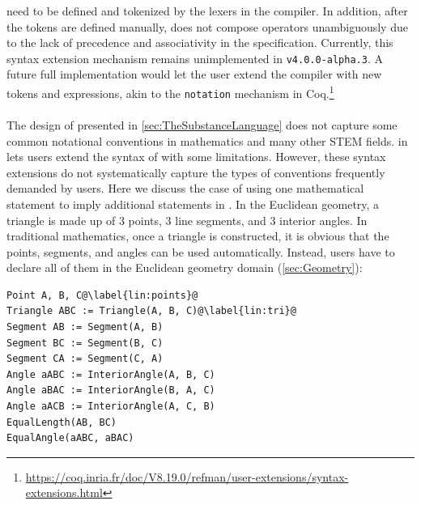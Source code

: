 \noindent need to be defined and tokenized by the lexers in the \Penrose{} compiler. In addition, after the tokens are defined manually,   does not compose operators unambiguously due to the lack of precedence and associativity in the specification. Currently, this syntax extension mechanism remains unimplemented in \Penrose{} \texttt{v4.0.0-alpha.3}. A future full implementation would let the user extend the compiler with new tokens and expressions, akin to the \texttt{notation} mechanism in Coq.\footnote{\url{https://coq.inria.fr/doc/V8.19.0/refman/user-extensions/syntax-extensions.html}} 


\paragraph{\inlineSUB{\Substance{}}} The design of \Substance{} presented in \cref{sec:TheSubstanceLanguage} does not capture some common notational conventions in mathematics and many other STEM fields.  in \Domain lets users extend the syntax of \Substance{} with some limitations. However, these syntax extensions do not systematically capture the types of conventions frequently demanded by \Penrose{} users. Here we discuss the case of using one mathematical statement to imply additional statements in \Substance{}. In the Euclidean geometry, a triangle is made up of 3 points, 3 line segments, and 3 interior angles. In traditional mathematics, once a triangle is constructed, it is obvious that the points, segments, and angles can be used automatically. Instead, users have to declare all of them in the Euclidean geometry domain (\cref{sec:Geometry}):

\vspace{1em}
\begin{mdframed}[style=SUBCode]
\begin{lstlisting}[language=Sub-geom,escapechar=@]
Point A, B, C@\label{lin:points}@
Triangle ABC := Triangle(A, B, C)@\label{lin:tri}@
Segment AB := Segment(A, B)
Segment BC := Segment(B, C)
Segment CA := Segment(C, A)
Angle aABC := InteriorAngle(A, B, C)
Angle aBAC := InteriorAngle(B, A, C)
Angle aACB := InteriorAngle(A, C, B)
EqualLength(AB, BC)
EqualAngle(aABC, aBAC)
\end{lstlisting}
\end{mdframed}
\vspace{1em}


